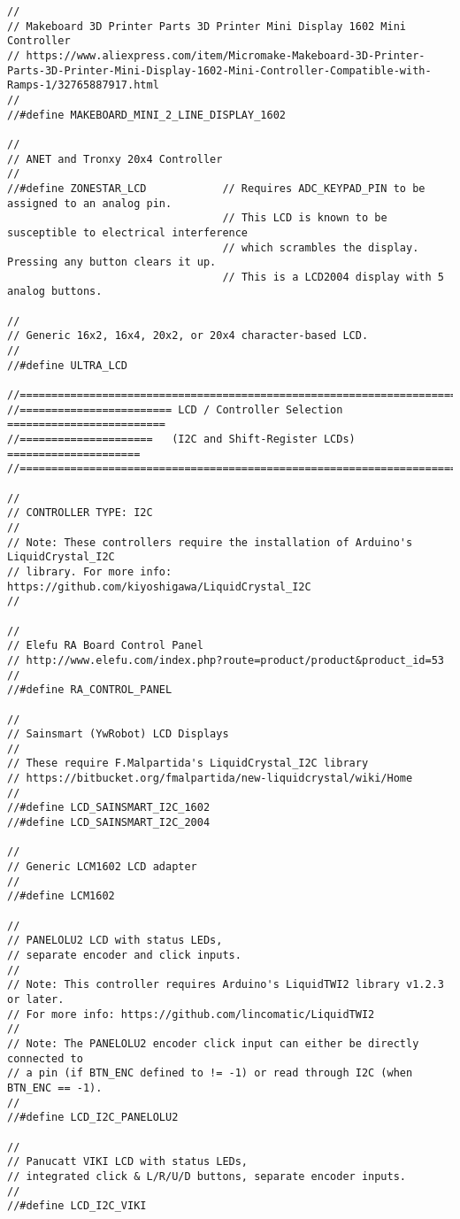 \begin{lstlisting}[caption = キャプション, label = ラベル]
//
// Makeboard 3D Printer Parts 3D Printer Mini Display 1602 Mini Controller
// https://www.aliexpress.com/item/Micromake-Makeboard-3D-Printer-Parts-3D-Printer-Mini-Display-1602-Mini-Controller-Compatible-with-Ramps-1/32765887917.html
//
//#define MAKEBOARD_MINI_2_LINE_DISPLAY_1602

//
// ANET and Tronxy 20x4 Controller
//
//#define ZONESTAR_LCD            // Requires ADC_KEYPAD_PIN to be assigned to an analog pin.
                                  // This LCD is known to be susceptible to electrical interference
                                  // which scrambles the display.  Pressing any button clears it up.
                                  // This is a LCD2004 display with 5 analog buttons.

//
// Generic 16x2, 16x4, 20x2, or 20x4 character-based LCD.
//
//#define ULTRA_LCD

//=============================================================================
//======================== LCD / Controller Selection =========================
//=====================   (I2C and Shift-Register LCDs)   =====================
//=============================================================================

//
// CONTROLLER TYPE: I2C
//
// Note: These controllers require the installation of Arduino's LiquidCrystal_I2C
// library. For more info: https://github.com/kiyoshigawa/LiquidCrystal_I2C
//

//
// Elefu RA Board Control Panel
// http://www.elefu.com/index.php?route=product/product&product_id=53
//
//#define RA_CONTROL_PANEL

//
// Sainsmart (YwRobot) LCD Displays
//
// These require F.Malpartida's LiquidCrystal_I2C library
// https://bitbucket.org/fmalpartida/new-liquidcrystal/wiki/Home
//
//#define LCD_SAINSMART_I2C_1602
//#define LCD_SAINSMART_I2C_2004

//
// Generic LCM1602 LCD adapter
//
//#define LCM1602

//
// PANELOLU2 LCD with status LEDs,
// separate encoder and click inputs.
//
// Note: This controller requires Arduino's LiquidTWI2 library v1.2.3 or later.
// For more info: https://github.com/lincomatic/LiquidTWI2
//
// Note: The PANELOLU2 encoder click input can either be directly connected to
// a pin (if BTN_ENC defined to != -1) or read through I2C (when BTN_ENC == -1).
//
//#define LCD_I2C_PANELOLU2

//
// Panucatt VIKI LCD with status LEDs,
// integrated click & L/R/U/D buttons, separate encoder inputs.
//
//#define LCD_I2C_VIKI


\end{lstlisting}
